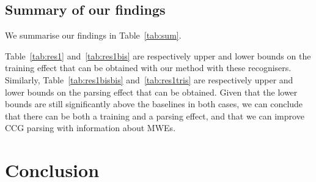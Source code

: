 \documentclass[output=paper]{LSP/langsci}
\begin{document}
\subsection{Summary of our findings}
We summarise our findings in Table~\ref{tab:sum}.
\begin{table}[H]
    \footnotesize
    \centering
    \caption{Summary of our findings\label{tab:sum}}
\end{table}

\indent Table~\ref{tab:res1} and~\ref{tab:res1bis} are respectively upper and lower bounds on the training effect that can be obtained with our method with these recognisers. Similarly, Table~\ref{tab:res1bisbis} and~\ref{tab:res1tris} are respectively upper and lower bounds on the parsing effect that can be obtained. Given that the lower bounds are still significantly above the baselines in both cases, we can conclude that there can be both a training and a parsing effect, and that we can improve CCG parsing with information about MWEs.

\section{Conclusion}
\label{ccl}
\end{document}
